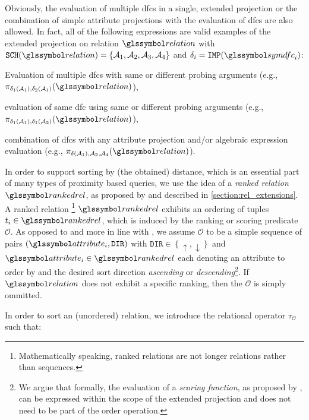 Obviously, the evaluation of multiple \acrshort{dfc}s in a single, extended projection or the combination of simple attribute projections with the evaluation of \acrshort{dfc}s are also allowed. In fact, all of the following expressions are valid examples of the extended projection on relation $\relation$ with $\mathtt{SCH}(\relation) = \{ \mathcal{A}_1, \mathcal{A}_2, \mathcal{A}_3, \mathcal{A}_4 \}$ and $\delta_i = \mathtt{IMP}(\symdfc_i)$: 
\begin{enumerate*}[label=(\roman*)]
    \item Evaluation of multiple \acrshort{dfc}s with same or different probing arguments (e.g., $\pi_{\delta_1(\mathcal{A}_1), \delta_2(\mathcal{A}_1)}(\relation)$), 
    \item evaluation of same \acrshort{dfc} using same or different probing arguments (e.g., $\pi_{\delta_1(\mathcal{A}_1), \delta_1(\mathcal{A}_2)}(\relation)$),
    \item combination of \acrshort{dfc}s with any attribute projection and/or algebraic expression evaluation (e.g., $\pi_{\delta(\mathcal{A}_1), \mathcal{A}_2, \mathcal{A}_4}(\relation)$).
\end{enumerate*}

In order to support sorting by (the obtained) distance, which is an essential part of many types of proximity based queries, we use the idea of a \emph{ranked relation} $\rankedrel$, as proposed by \cite{Chengkai:2005RankSQL} and described in \cref{section:rel_extensions}. A ranked relation \footnote{Mathematically speaking, ranked relations are not longer relations rather than sequences.} $\rankedrel$ exhibits an ordering of tuples $t_i \in \rankedrel$, which is induced by the ranking or scoring predicate $\mathcal{O}$. As opposed to \cite{Chengkai:2005RankSQL} and more in line with \cite{Garcia:2009Database}, we assume $\mathcal{O}$ to be a simple sequence of pairs $(\attribute_i, \mathtt{DIR})$ with $\mathtt{DIR} \in \left\{ \uparrow, \downarrow \right\}$ and $\attribute_i \in \rankedrel$ each denoting an attribute to order by and the desired sort direction \emph{ascending} or \emph{descending}\footnote{We argue that formally, the evaluation of a \emph{scoring function}, as proposed by \cite{Chengkai:2005RankSQL}, can be expressed within the scope of the extended projection and does not need to be part of the order operation.}. If $\relation$ does not exhibit a specific ranking, then the $\mathcal{O}$ is simply ommitted.

In order to sort an (unordered) relation, we introduce the relational operator $\tau_{\mathcal{O}}$ such that:

